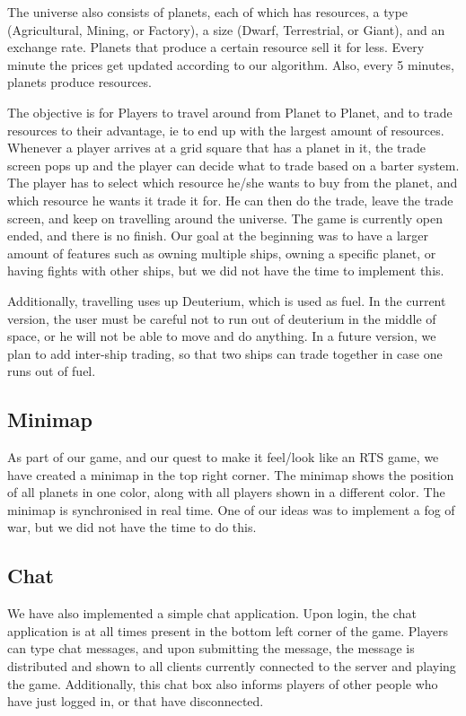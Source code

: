 \documentclass[a4paper,11pt]{article}
\begin{document}
			The universe also consists of planets, each of which has resources, a type (Agricultural, Mining, or Factory), a size (Dwarf, Terrestrial, or Giant), and an exchange rate. Planets that produce a certain resource sell it for less. Every minute the prices get updated according to our algorithm. Also, every 5 minutes, planets produce resources.
		
			The objective is for Players to travel around from Planet to Planet, and to trade resources to their advantage, ie to end up with the largest amount of resources. Whenever a player arrives at a grid square that has a planet in it, the trade screen pops up and the player can decide what to trade based on a barter system. The player has to select which resource he/she wants to buy from the planet, and which resource he wants it trade it for. He can then do the trade, leave the trade screen, and keep on travelling around the universe. The game is currently open ended, and there is no finish. Our goal at the beginning was to have a larger amount of features such as owning multiple ships, owning a specific planet, or having fights with other ships, but we did not have the time to implement this.
			
			Additionally, travelling uses up Deuterium, which is used as fuel. In the current version, the user must be careful not to run out of deuterium in the middle of space, or he will not be able to move and do anything. In a future version, we plan to add inter-ship trading, so that two ships can trade together in case one runs out of fuel.
			
		
		\subsection{Minimap}
			
			As part of our game, and our quest to make it feel/look like an RTS game, we have created a minimap in the top right corner. The minimap shows the position of all planets in one color, along with all players shown in a different color. The minimap is synchronised in real time. One of our ideas was to implement a fog of war, but we did not have the time to do this.
			
		\subsection{Chat}
			
			We have also implemented a simple chat application. Upon login, the chat application is at all times present in the bottom left corner of the game. Players can type chat messages, and upon submitting the message, the message is distributed and shown to all clients currently connected to the server and playing the game. Additionally, this chat box also informs players of other people who have just logged in, or that have disconnected.
			
\end{document}
